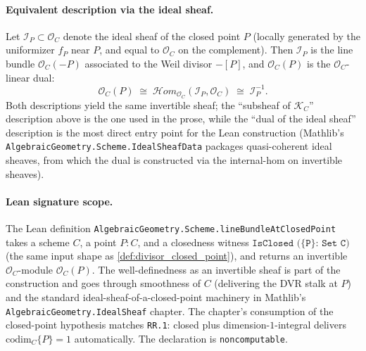 \begin{definition}
  \paragraph{Equivalent description via the ideal sheaf.} Let
  \(\mathcal I_P \subset \mathcal O_C\) denote the ideal sheaf of the
  closed point \(P\) (locally generated by the uniformizer \(f_P\) near
  \(P\), and equal to \(\mathcal O_C\) on the complement). Then
  \(\mathcal I_P\) is the line bundle \(\mathcal O_C(-P)\) associated to the
  Weil divisor \(-[P]\), and \(\mathcal O_C(P)\) is the
  \(\mathcal O_C\)-linear dual:
  \[
    \mathcal O_C(P) \;\cong\; \mathcal H\!om_{\mathcal O_C}(\mathcal I_P,
    \mathcal O_C)
    \;\cong\; \mathcal I_P^{-1}.
  \]
  Both descriptions yield the same invertible sheaf; the
  ``subsheaf of \(\mathcal K_C\)'' description above is the one used in
  the prose, while the ``dual of the ideal sheaf'' description is the
  most direct entry point for the Lean construction (Mathlib's
  \texttt{AlgebraicGeometry.Scheme.IdealSheafData} packages
  quasi-coherent ideal sheaves, from which the dual is constructed via
  the internal-hom on invertible sheaves).

  \paragraph{Lean signature scope.} The Lean definition
  \texttt{AlgebraicGeometry.Scheme.lineBundleAtClosedPoint} takes a
  scheme \(C\), a point \(P : C\), and a closedness witness
  \(\texttt{IsClosed (\{P\} : Set C)}\) (the same input shape as
  \cref{def:divisor_closed_point}), and returns an invertible
  \(\mathcal O_C\)-module \(\mathcal O_C(P)\). The well-definedness as an
  invertible sheaf is part of the construction and goes through
  smoothness of \(C\) (delivering the DVR stalk at \(P\)) and the standard
  ideal-sheaf-of-a-closed-point machinery in Mathlib's
  \texttt{AlgebraicGeometry.IdealSheaf} chapter. The chapter's
  consumption of the closed-point hypothesis matches \texttt{RR.1}:
  closed plus dimension-\(1\)-integral delivers \(\mathrm{codim}_C \{P\} = 1\)
  automatically. The declaration is \texttt{noncomputable}.
\end{definition}

